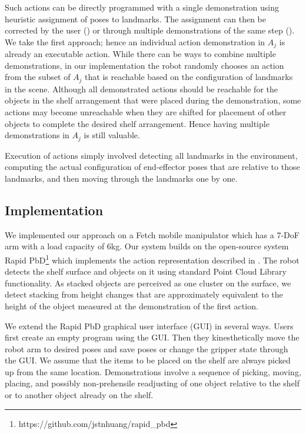 Such actions can be directly programmed with a single demonstration using heuristic assignment of poses to landmarks.
The assignment can then be corrected by the user (\cite{alexandrova2014robot}) or through multiple demonstrations of the same step (\cite{niekum2012learning}).
We take the first approach; hence an individual action demonstration in $A_j$ is already an executable action.
While there can be ways to combine multiple demonstrations, in our implementation the robot randomly chooses an action from the subset of $A_j$ that is reachable based on the configuration of landmarks in the scene.
Although all demonstrated actions should be reachable for the objects in the shelf arrangement that were placed during the demonstration, some actions may become unreachable when they are shifted for placement of other objects to complete the desired shelf arrangement.
Hence having multiple demonstrations in $A_j$ is still valuable.

Execution of actions simply involved detecting all landmarks in the environment, computing the actual configuration of end-effector poses that are relative to those landmarks, and then moving through the landmarks one by one.

\subsection{Implementation}
\label{sec:irosimplementation}

We implemented our approach on a Fetch mobile manipulator which has a 7-DoF arm with a load capacity of 6kg.
Our system builds on the open-source system Rapid PbD\footnote{https://github.com/jstnhuang/rapid_pbd} which implements the action representation described in .
The robot detects the shelf surface and objects on it using standard Point Cloud Library functionality.
As stacked objects are perceived as one cluster on the surface, we detect stacking from height changes that are approximately equivalent to the height of the object measured at the demonstration of the first action.

We extend the Rapid PbD graphical user interface (GUI) in several ways.
Users first create an empty program using the GUI.
Then they kinesthetically move the robot arm to desired poses and save poses or change the gripper state through the GUI.
We assume that the items to be placed on the shelf are always picked up from the same location.
Demonstrations involve a sequence of picking, moving, placing, and possibly non-prehensile readjusting of one object relative to the shelf or to another object already on the shelf.

